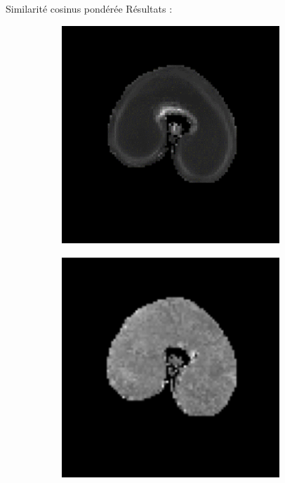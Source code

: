 \documentclass[10pt]{beamer}
\begin{document}
\begin{frame}{Similarité cosinus pondérée}
  Résultats :

    \begin{figure}[ht]
    \centering
    \begin{subfigure}[t]{0.25\textwidth}
      \centering
      \includegraphics[width=0.9\textwidth]{fig/mri_slice8_250}
      \caption{}
      \label{subfig:mri_slice8_250}
    \end{subfigure}%
     \begin{subfigure}[t]{0.25\textwidth}
        \centering
        \includegraphics[width=0.9\textwidth]{fig/cosine_msi}%

\end{subfigure}
\end{figure}
\end{frame}
\end{document}
